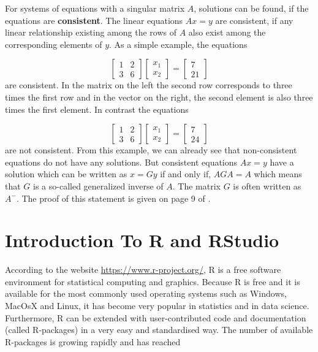 \documentclass[
]{book}
\begin{document}
For systems of equations with a singular matrix \(A\), solutions can be found, if the equations are \textbf{consistent}. The linear equations \(Ax = y\) are consistent, if any linear relationship existing among the rows of \(A\) also exist among the corresponding elements of \(y\). As a simple example, the equations

\[
\left[
\begin{array}{cc}
1  &  2  \\
3  &  6
\end{array}\right]
\left[
\begin{array}{c}
x_1  \\
x_2
\end{array}\right]
=
\left[
\begin{array}{c}
7  \\
21
\end{array}\right]
\]
are consistent. In the matrix on the left the second row corresponds to three times the first row and in the vector on the right, the second element is also three times the first element. In contrast the equations

\[
\left[
\begin{array}{cc}
1  &  2  \\
3  &  6
\end{array}\right]
\left[
\begin{array}{c}
x_1  \\
x_2
\end{array}\right]
=
\left[
\begin{array}{c}
7  \\
24
\end{array}\right]
\]
are not consistent. From this example, we can already see that non-consistent equations do not have any solutions. But consistent equations \(Ax = y\) have a solution which can be written as \(x = Gy\) if and only if, \(AGA = A\) which means that \(G\) is a so-called generalized inverse of \(A\). The matrix \(G\) is often written as \(A^-\). The proof of this statement is given on page 9 of \citep{Searle1971}.

\hypertarget{intro-rstats}{%
\chapter{Introduction To R and RStudio}\label{intro-rstats}}

According to the website \url{https://www.r-project.org/}, R \citep{RCoreTeam2018} is a free software environment for statistical computing and graphics. Because R is free and it is available for the most commonly used operating systems such as Windows, MacOsX and Linux, it has become very popular in statistics and in data science. Furthermore, R can be extended with user-contributed code and documentation (called R-packages) in a very easy and standardised way. The number of available R-packages is growing rapidly and has reached
\end{document}

